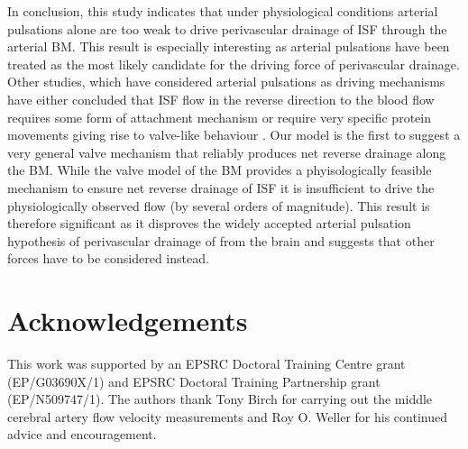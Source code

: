 \documentclass[a4paper,titlepage]{scrartcl}
\begin{document}
In conclusion, this study indicates that under physiological conditions arterial pulsations alone are too weak to drive perivascular drainage of ISF through the arterial BM. This result is especially interesting as arterial pulsations have been treated as the most likely candidate for the driving force of perivascular drainage. Other studies, which have considered arterial pulsations as driving mechanisms have either concluded that ISF flow in the reverse direction to the blood flow requires some form of attachment mechanism \cite{Schley2006,Wang2011} or require very specific protein movements giving rise to valve-like behaviour \cite{Sharp2015}. Our model is the first to suggest a very general valve mechanism that reliably produces net reverse drainage along the BM. While the valve model of the BM provides a phyisologically feasible mechanism to ensure net reverse drainage of ISF it is insufficient to drive the physiologically observed flow (by several orders of magnitude). This result is therefore significant as it disproves the widely accepted arterial pulsation hypothesis of perivascular drainage of \Ab from the brain \cite{Weller2009,Carare2008,Hawkes2011,Morris2014,Schley2006,Attems2011,Wang2011,Iliff2012,Asgari2015,Sharp2015,Weller2015a} and suggests that other forces have to be considered instead.

\section*{Acknowledgements}

This work was supported by an EPSRC Doctoral Training Centre grant (EP/G03690X/1) and EPSRC Doctoral Training Partnership grant (EP/N509747/1). The authors thank Tony Birch for carrying out the middle cerebral artery flow velocity measurements and Roy O. Weller for his continued advice and encouragement.

%
%

\end{document}

